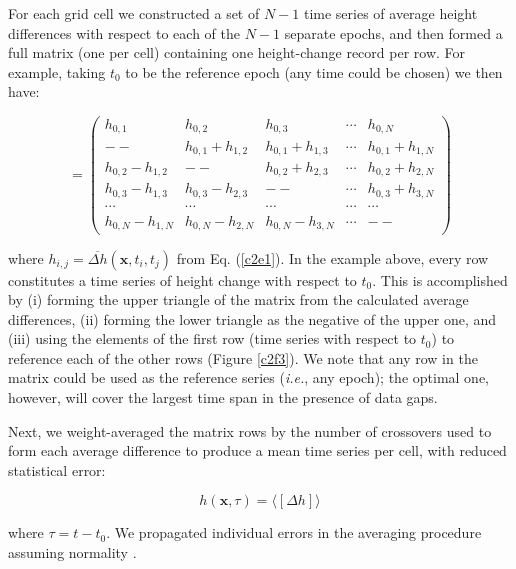 For each grid cell we constructed a set of $N-1$ time series of average height differences with respect to each of the $N-1$ separate epochs, and then formed a full matrix (one per cell) containing one height-change record per row. For example, taking $t_0$ to be the reference epoch (any time could be chosen) we then have:

\begin{equation}
  [\Delta h] = 
  \begin{pmatrix}
    h_{0,1} & h_{0,2} & h_{0,3} & \cdots & h_{0,N} \\
    -- & h_{0,1} + h_{1,2} & h_{0,1} + h_{1,3} & \cdots & h_{0,1} + h_{1,N} \\
    h_{0,2} - h_{1,2} & -- & h_{0,2} + h_{2,3} & \cdots & h_{0,2} + h_{2,N} \\
    h_{0,3} - h_{1,3} & h_{0,3} - h_{2,3} & -- & \cdots & h_{0,3} + h_{3,N} \\
    \cdots & \cdots & \cdots & \cdots & \cdots \\
    h_{0,N} - h_{1,N} & h_{0,N} - h_{2,N} & h_{0,N} - h_{3,N} & \cdots & --
  \end{pmatrix}
  \label{c2e2}
\end{equation}

\noindent
where $h_{i,j} = \overbar{\Delta h}(\mathbf{x}, t_i, t_j)$ from Eq. (\ref{c2e1}). In the example above, every row constitutes a time series of height change with respect to $t_0$. This is accomplished by (i) forming the upper triangle of the matrix from the calculated average differences, (ii) forming the lower triangle as the negative of the upper one, and (iii) using the elements of the first row (time series with respect to $t_0$) to reference each of the other rows (Figure \ref{c2f3}). We note that any row in the matrix could be used as the reference series ({\it i.e.}, any epoch); the optimal one, however, will cover the largest time span in the presence of data gaps.

Next, we weight-averaged the matrix rows by the number of crossovers used to form each average difference to produce a mean time series per cell, with reduced statistical error:

\begin{equation}
  h(\mathbf x, \tau) = \langle [\Delta h] \rangle 
  \label{c2e3}
\end{equation}

\noindent
where $\tau = t - t_0$. We propagated individual errors in the averaging procedure assuming normality \parencite{Li2006}.

